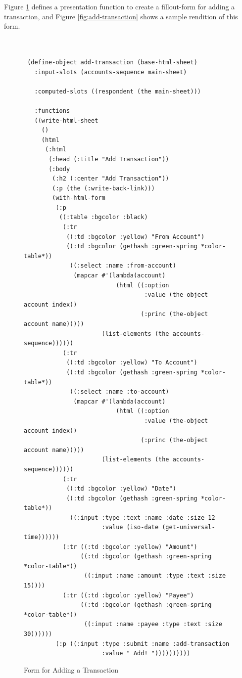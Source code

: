 \documentclass [11pt]{book}
\begin{document}
Figure 
\ref{code:add-transactions-sheet} defines a presentation function to create a fillout-form for adding
a transaction, and Figure 
\ref{fig:add-transaction} shows a sample rendition of this form.
\begin{figure}
\begin{lrbox}{\boxedverb}
\begin{minipage}{\linewidth}
\small{

\begin{verbatim}


 (define-object add-transaction (base-html-sheet)
   :input-slots (accounts-sequence main-sheet)

   :computed-slots ((respondent (the main-sheet)))
   
   :functions
   ((write-html-sheet
     ()
     (html 
      (:html 
       (:head (:title "Add Transaction"))
       (:body 
        (:h2 (:center "Add Transaction"))
        (:p (the (:write-back-link)))
        (with-html-form
         (:p 
          ((:table :bgcolor :black)
           (:tr 
            ((:td :bgcolor :yellow) "From Account")
            ((:td :bgcolor (gethash :green-spring *color-table*))
             ((:select :name :from-account)
              (mapcar #'(lambda(account)
                          (html ((:option 
                                  :value (the-object account index))
                                 (:princ (the-object account name)))))
                      (list-elements (the accounts-sequence))))))
           (:tr 
            ((:td :bgcolor :yellow) "To Account")
            ((:td :bgcolor (gethash :green-spring *color-table*))
             ((:select :name :to-account)
              (mapcar #'(lambda(account)
                          (html ((:option 
                                  :value (the-object account index))
                                 (:princ (the-object account name)))))
                      (list-elements (the accounts-sequence))))))
           (:tr 
            ((:td :bgcolor :yellow) "Date")
            ((:td :bgcolor (gethash :green-spring *color-table*))
             ((:input :type :text :name :date :size 12 
                      :value (iso-date (get-universal-time))))))
           (:tr ((:td :bgcolor :yellow) "Amount") 
                ((:td :bgcolor (gethash :green-spring *color-table*))
                 ((:input :name :amount :type :text :size 15))))
           (:tr ((:td :bgcolor :yellow) "Payee") 
                ((:td :bgcolor (gethash :green-spring *color-table*))
                 ((:input :name :payee :type :text :size 30))))))
         (:p ((:input :type :submit :name :add-transaction 
                      :value " Add! "))))))))))      

\end{verbatim}}
\end{minipage}
\end{lrbox}
\fbox{\usebox{\boxedverb}}

\caption{Form for Adding a Transaction}

\label{code:add-transactions-sheet}

\end{figure}
\end{document}
